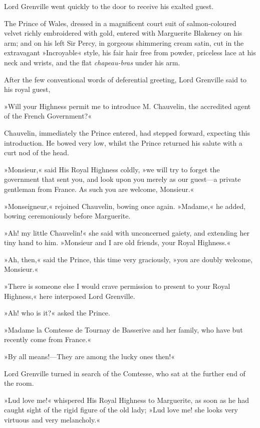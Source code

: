 Lord Grenville went quickly to the door to receive his exalted guest.

The Prince of Wales, dressed in a magnificent court suit of salmon-coloured velvet richly embroidered with gold, entered with Marguerite Blakeney on his arm; and on his left Sir Percy, in gorgeous shimmering cream satin, cut in the extravagant »Incroyable« style, his fair hair free from powder, priceless lace at his neck and wrists, and the flat \textit{chapeau-bras} under his arm.

After the few conventional words of deferential greeting, Lord Grenville said to his royal guest,\longdash


»Will your Highness permit me to introduce M. Chauvelin, the accredited agent of the French Government?«

Chauvelin, immediately the Prince entered, had stepped forward, expecting this introduction. He bowed very low, whilst the Prince returned his salute with a curt nod of the head.

»Monsieur,« said His Royal Highness coldly, »we will try to forget the government that sent you, and look upon you merely as our guest—a private gentleman from France. As such you are welcome, Monsieur.«

»Monseigneur,« rejoined Chauvelin, bowing once again. »Madame,« he added, bowing ceremoniously before Marguerite.

»Ah! my little Chauvelin!« she said with unconcerned gaiety, and extending her tiny hand to him. »Monsieur and I are old friends, your Royal Highness.«

»Ah, then,« said the Prince, this time very graciously, »you are doubly welcome, Monsieur.«

»There is someone else I would crave permission to present to your Royal Highness,« here interposed Lord Grenville.

»Ah! who is it?« asked the Prince.

»Madame la Comtesse de Tournay de Basserive and her family, who have but recently come from France.«

»By all means!—They are among the lucky ones then!«

Lord Grenville turned in search of the Comtesse, who sat at the further end of the room.

»Lud love me!« whispered His Royal Highness to Marguerite, as soon as he had caught sight of the rigid figure of the old lady; »Lud love me! she looks very virtuous and very melancholy.«


